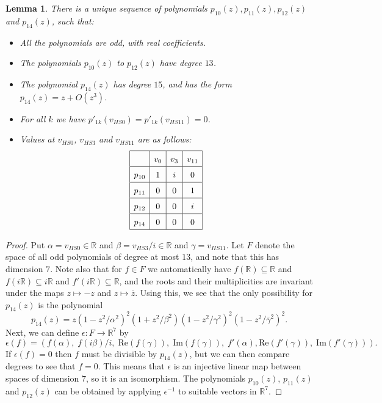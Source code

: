 \documentclass[reqno]{amsart}
\newcommand{\al}        {\alpha}
\newcommand{\bt}        {\beta}
\newcommand{\gm}        {\gamma}
\newcommand{\ep}        {\epsilon}
\newcommand{\R}         {{\mathbb{R}}}
\newcommand{\ov}[1]     {\overline{#1}}
\newcommand{\sse}       {\subseteq}
\renewcommand{\:}{\colon}
\newtheorem{lemma}[theorem]{Lemma}
\theoremstyle{definition}
\begin{document}
\begin{lemma}
 There is a unique sequence of polynomials
 $p_{10}(z),p_{11}(z),p_{12}(z)$ and $p_{14}(z)$, such that:
 \begin{itemize}
  \item[(a)] All the polynomials are odd, with real coefficients.
  \item[(b)] The polynomials $p_{10}(z)$ to $p_{12}(z)$ have degree
   $13$.
  \item[(c)] The polynomial $p_{14}(z)$ has degree $15$, and has the
   form $p_{14}(z)=z+O(z^3)$.
  \item[(d)] For all $k$ we have
   $p'_{1k}(v_{HS0})=p'_{1k}(v_{HS11})=0$.
  \item[(e)] Values at $v_{HS0}$, $v_{HS3}$ and $v_{HS11}$ are as
   follows:
   \[ \renewcommand{\arraystretch}{1.5}
      \begin{array}{|c|c|c|c|} \hline
              & v_0 & v_3 & v_{11} \\ \hline
       p_{10} & 1   & i   & 0      \\ \hline
       p_{11} & 0   & 0   & 1      \\ \hline
       p_{12} & 0   & 0   & i      \\ \hline
       p_{14} & 0   & 0   & 0      \\ \hline
      \end{array}
   \]
 \end{itemize}
\end{lemma}
\begin{proof}
 Put $\al=v_{HS0}\in\R$ and $\bt=v_{HS3}/i\in\R$ and $\gm=v_{HS11}$.
 Let $F$ denote the space of all odd polynomials of degree at most
 $13$, and note that this has dimension $7$.  Note also that for
 $f\in F$ we automatically have $f(\R)\sse\R$ and $f(i\R)\sse i\R$ and
 $f'(i\R)\sse\R$, and the roots and their multiplicities are invariant
 under the maps $z\mapsto -z$ and $z\mapsto\ov{z}$.  Using this, we
 see that the only possibility for $p_{14}(z)$ is the polynomial
 \[ p_{14}(z) =
     z(1-z^2/\al^2)^2(1+z^2/\bt^2)(1-z^2/\gm^2)^2(1-z^2/\ov{\gm}^2)^2.
 \]
 Next, we can define $\ep\:F\to\R^7$ by
 \[ \ep(f) = (f(\al),\;
              f(i\bt)/i,\;
              \text{Re}(f(\gm)),\;
              \text{Im}(f(\gm)),\;
              f'(\al),
              \text{Re}(f'(\gm)),\;
              \text{Im}(f'(\gm))).
 \]
 If $\ep(f)=0$ then $f$ must be divisible by $p_{14}(z)$, but we can
 then compare degrees to see that $f=0$.  This means that $\ep$ is an
 injective linear map between spaces of dimension $7$, so it is an
 isomorphism.  The polynomials $p_{10}(z)$, $p_{11}(z)$ and
 $p_{12}(z)$ can be obtained by applying $\ep^{-1}$ to suitable
 vectors in $\R^7$.
\end{proof}
\end{document}
